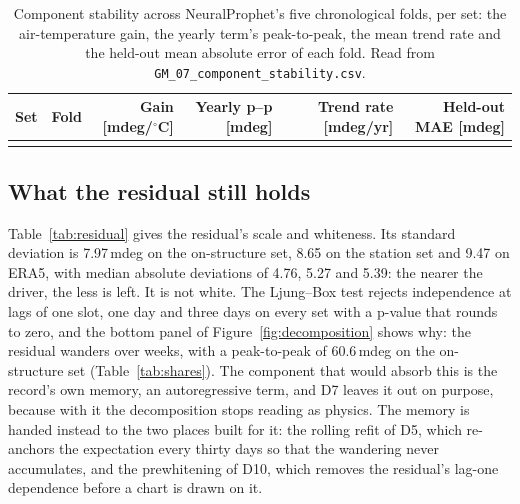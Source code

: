 \documentclass[11pt,a4paper]{article}
\begin{document}
\begin{table}[H]
\centering
\caption{Component stability across NeuralProphet's five chronological folds,
per set: the air-temperature gain, the yearly term's peak-to-peak, the mean
trend rate and the held-out mean absolute error of each fold. Read from
\texttt{GM\_07\_component\_stability.csv}.}
\label{tab:stability}
{\small\setlength{\tabcolsep}{4.5pt}
\begin{tabular}{lrrrrr}
\toprule
Set & Fold & Gain [mdeg/$^{\circ}$C] & Yearly p--p [mdeg] & Trend rate [mdeg/yr] & Held-out MAE [mdeg] \\
\midrule
\\
\bottomrule
\end{tabular}}
\end{table}

\subsection{What the residual still holds}

Table~\ref{tab:residual} gives the residual's scale and whiteness. Its
standard deviation is 7.97\,mdeg on the on-structure set, 8.65 on the station
set and 9.47 on ERA5, with median absolute deviations of 4.76, 5.27 and 5.39:
the nearer the driver, the less is left. It is not white. The Ljung--Box test
rejects independence at lags of one slot, one day and three days on every set
with a p-value that rounds to zero, and the bottom panel of
Figure~\ref{fig:decomposition} shows why: the residual wanders over weeks,
with a peak-to-peak of 60.6\,mdeg on the on-structure set
(Table~\ref{tab:shares}). The component that would absorb this is the
record's own memory, an autoregressive term, and D7 leaves it out on purpose,
because with it the decomposition stops reading as physics. The memory is
handed instead to the two places built for it: the rolling refit of D5, which
re-anchors the expectation every thirty days so that the wandering never
accumulates, and the prewhitening of D10, which removes the residual's
lag-one dependence before a chart is drawn on it.
\end{document}
